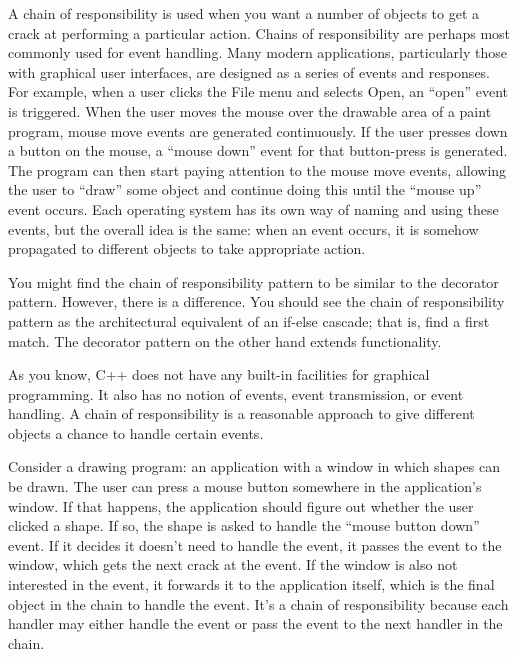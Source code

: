 
A chain of responsibility is used when you want a number of objects to get a crack at performing a particular action. Chains of responsibility are perhaps most commonly used for event handling. Many modern applications, particularly those with graphical user interfaces, are designed as a series of events and responses. For example, when a user clicks the File menu and selects Open, an “open” event is triggered. When the user moves the mouse over the drawable area of a paint program, mouse move events are generated continuously. If the user presses down a button on the mouse, a “mouse down” event for that button-press is generated. The program can then start paying attention to the mouse move events, allowing the user to “draw” some object and continue doing this until the “mouse up” event occurs. Each operating system has its own way of naming and using these events, but the overall idea is the same: when an event occurs, it is somehow propagated to different objects to take appropriate action.

You might find the chain of responsibility pattern to be similar to the decorator pattern. However, there is a difference. You should see the chain of responsibility pattern as the architectural equivalent of an if-else cascade; that is, find a first match. The decorator pattern on the other hand extends functionality.

As you know, C++ does not have any built-in facilities for graphical programming. It also has no notion of events, event transmission, or event handling. A chain of responsibility is a reasonable approach to give different objects a chance to handle certain events.


Consider a drawing program: an application with a window in which shapes can be drawn. The user can press a mouse button somewhere in the application’s window. If that happens, the application should figure out whether the user clicked a shape. If so, the shape is asked to handle the “mouse button down” event. If it decides it doesn’t need to handle the event, it passes the event to the window, which gets the next crack at the event. If the window is also not interested in the event, it forwards it to the application itself, which is the final object in the chain to handle the event. It’s a chain of responsibility because each handler may either handle the event or pass the event to the next handler in the chain.


